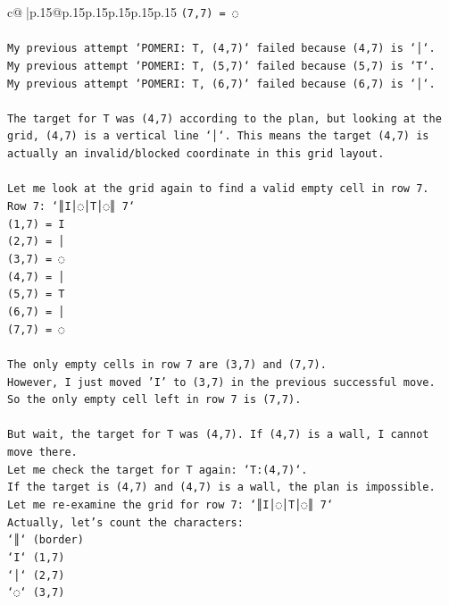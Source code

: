 \documentclass{article}
\begin{document}
{\begin{supertabular}{c@{$\;$}|p{.15\linewidth}@{}p{.15\linewidth}p{.15\linewidth}p{.15\linewidth}p{.15\linewidth}p{.15\linewidth}}
{{{\texttt{(7,7) = ◌} \\
\\ 
\texttt{My previous attempt `POMERI: T, (4,7)` failed because (4,7) is `│`.} \\
\texttt{My previous attempt `POMERI: T, (5,7)` failed because (5,7) is `T`.} \\
\texttt{My previous attempt `POMERI: T, (6,7)` failed because (6,7) is `│`.} \\
\\ 
\texttt{The target for T was (4,7) according to the plan, but looking at the grid, (4,7) is a vertical line `│`. This means the target (4,7) is actually an invalid/blocked coordinate in this grid layout.} \\
\\ 
\texttt{Let me look at the grid again to find a valid empty cell in row 7.} \\
\texttt{Row 7: `║I│◌│T│◌║ 7`} \\
\texttt{(1,7) = I} \\
\texttt{(2,7) = │} \\
\texttt{(3,7) = ◌} \\
\texttt{(4,7) = │} \\
\texttt{(5,7) = T} \\
\texttt{(6,7) = │} \\
\texttt{(7,7) = ◌} \\
\\ 
\texttt{The only empty cells in row 7 are (3,7) and (7,7).} \\
\texttt{However, I just moved 'I' to (3,7) in the previous successful move.} \\
\texttt{So the only empty cell left in row 7 is (7,7).} \\
\\ 
\texttt{But wait, the target for T was (4,7). If (4,7) is a wall, I cannot move there.} \\
\texttt{Let me check the target for T again: `T:(4,7)`.} \\
\texttt{If the target is (4,7) and (4,7) is a wall, the plan is impossible.} \\
\texttt{Let me re{-}examine the grid for row 7: `║I│◌│T│◌║ 7`} \\
\texttt{Actually, let's count the characters:} \\
\texttt{`║` (border)} \\
\texttt{`I` (1,7)} \\
\texttt{`│` (2,7)} \\
\texttt{`◌` (3,7)} \\
}}}
\end{supertabular}}
\end{document}
